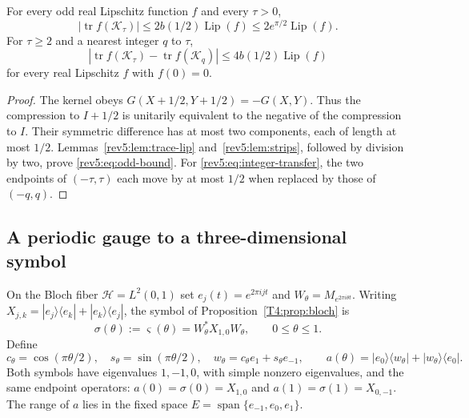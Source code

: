 \begin{corollary}
\label{rev5:cor:odd-endpoints}
For every odd real Lipschitz function $f$ and every $\tau>0$,
\begin{equation}\label{rev5:eq:odd-bound}
 |\operatorname{tr}f(\mathcal K_\tau)|
 \leq2b(1/2)\operatorname{Lip}(f)
 \leq2e^{\pi/2}\operatorname{Lip}(f).
\end{equation}
For $\tau\geq2$ and a nearest integer $q$ to $\tau$,
\begin{equation}\label{rev5:eq:integer-transfer}
 |\operatorname{tr}f(\mathcal K_\tau)
       -\operatorname{tr}f(\mathcal K_q)|
 \leq4b(1/2)\operatorname{Lip}(f)
\end{equation}
for every real Lipschitz $f$ with $f(0)=0$.
\end{corollary}

\begin{proof}
The kernel obeys $G(X+1/2,Y+1/2)=-G(X,Y)$.  Thus the compression to
$I+1/2$ is unitarily equivalent to the negative of the compression to
$I$.  Their symmetric difference has at most two components, each of
length at most $1/2$.  Lemmas~\ref{rev5:lem:trace-lip}
and~\ref{rev5:lem:strips}, followed by division by two, prove
\eqref{rev5:eq:odd-bound}.  For \eqref{rev5:eq:integer-transfer}, the
two endpoints of $(-\tau,\tau)$ each move by at most $1/2$ when replaced
by those of $(-q,q)$.
\end{proof}

\subsection{A periodic gauge to a three-dimensional symbol}
\label{rev5:subsec:gauge}

On the Bloch fiber $\mathscr H=L^2(0,1)$ set
$e_j(t)=e^{2\pi ijt}$ and $W_\theta=M_{e^{2\pi i\theta t}}$.
Writing $X_{j,k}=|e_j\rangle\langle e_k|+|e_k\rangle\langle e_j|$,
the symbol of Proposition~\ref{T4:prop:bloch} is
\[
 \sigma(\theta):=\varsigma(\theta)=W_\theta^*X_{1,0}W_\theta,
 \qquad 0\leq\theta\leq1.
\]
Define
\begin{equation}\label{rev5:eq:star}
 c_\theta=\cos(\pi\theta/2),\quad s_\theta=\sin(\pi\theta/2),\quad
 w_\theta=c_\theta e_1+s_\theta e_{-1},\qquad
 a(\theta)=|e_0\rangle\langle w_\theta|
             +|w_\theta\rangle\langle e_0|.
\end{equation}
Both symbols have eigenvalues $1,-1,0$, with simple nonzero eigenvalues,
and the same endpoint operators:
$a(0)=\sigma(0)=X_{1,0}$ and $a(1)=\sigma(1)=X_{0,-1}$.
The range of $a$ lies in the fixed space
$E=\operatorname{span}\{e_{-1},e_0,e_1\}$.

